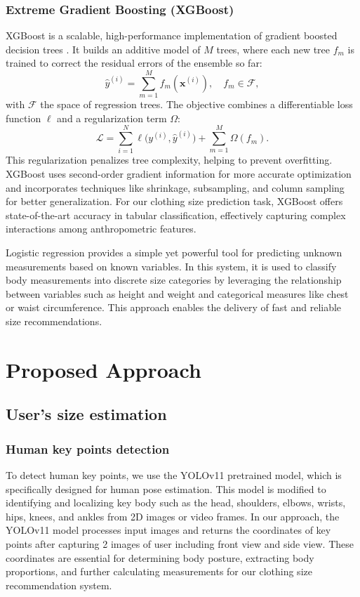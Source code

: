 \documentclass{llncs}
\begin{document}
\subsubsection{Extreme Gradient Boosting (XGBoost)}
XGBoost is a scalable, high-performance implementation of gradient boosted decision trees \cite{ref20} . It builds an additive model of $M$ trees, where each new tree $f_{m}$ is trained to correct the residual errors of the ensemble so far:
\begin{equation}
\hat{y}^{(i)} = \sum_{m=1}^{M} f_{m}(\mathbf{x}^{(i)}), \quad f_{m} \in \mathcal{F},
\end{equation}
with $\mathcal{F}$ the space of regression trees. The objective combines a differentiable loss function $\ell$ and a regularization term $\Omega$:
\begin{equation}
\mathcal{L} = \sum_{i=1}^{N}\ell\big(y^{(i)}, \hat{y}^{(i)}\big) + \sum_{m=1}^{M}\Omega(f_{m}).
\end{equation}
This regularization penalizes tree complexity, helping to prevent overfitting. XGBoost uses second-order gradient information for more accurate optimization and incorporates techniques like shrinkage, subsampling, and column sampling for better generalization. For our clothing size prediction task, XGBoost offers state-of-the-art accuracy in tabular classification, effectively capturing complex interactions among anthropometric features.

Logistic regression provides a simple yet powerful tool for predicting unknown measurements based on known variables. 
In this system, it is used to classify body measurements into discrete size categories by leveraging the relationship between variables such as height and weight and categorical measures like chest or waist circumference. 
This approach enables the delivery of fast and reliable size recommendations.
\section{Proposed Approach}

\subsection{User's size estimation}

\subsubsection{Human key points detection}
To detect human key points, we use the YOLOv11 pretrained model, which is specifically designed for human pose estimation. This model is modified to identifying and localizing key body such as the head, shoulders, elbows, wrists, hips, knees, and ankles from 2D images or video frames. In our approach, the YOLOv11 model processes input images and returns the coordinates of key points after capturing 2 images of user including front view and side view. These coordinates are essential for determining body posture, extracting body proportions, and further calculating measurements for our clothing size recommendation system.
\end{document}
